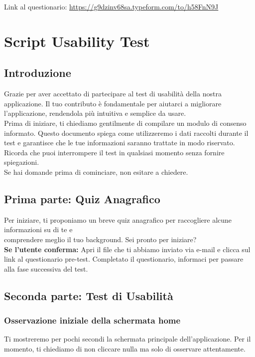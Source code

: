 \documentclass{article}
\begin{document}
\noindent Link al questionario: \url{https://g9dzinv68sa.typeform.com/to/h58FnN9J}

\section{Script Usability Test}
\subsection{Introduzione}
Grazie per aver accettato di partecipare al test di usabilità della nostra applicazione. Il tuo contributo è fondamentale per aiutarci a migliorare l'applicazione, rendendola più intuitiva e semplice da usare.\\
Prima di iniziare, ti chiediamo gentilmente di compilare un modulo di consenso informato. Questo documento spiega come utilizzeremo i dati raccolti durante il test e garantisce che le tue informazioni saranno trattate in modo riservato. Ricorda che puoi interrompere il test in qualsiasi momento senza fornire spiegazioni.\\
Se hai domande prima di cominciare, non esitare a chiedere.

\subsection{Prima parte: Quiz Anagrafico}
Per iniziare, ti proponiamo un breve quiz anagrafico per raccogliere alcune informazioni su di te e\\ comprendere meglio il tuo background. Sei pronto per iniziare?\\

\textbf{Se l'utente conferma:} Apri il file che ti abbiamo inviato via e-mail e clicca sul link al questionario pre-test. Completato il questionario, informaci per passare alla fase successiva del test.

\subsection{Seconda parte: Test di Usabilità}
\subsubsection{Osservazione iniziale della schermata home}
Ti mostreremo per pochi secondi la schermata principale dell’applicazione. Per il momento, ti chiediamo di non cliccare nulla ma solo di osservare attentamente.\\
\end{document}

